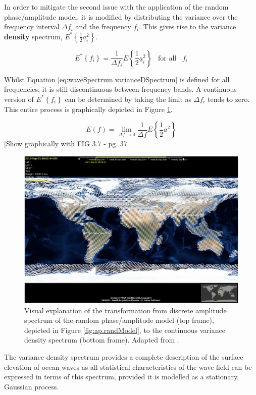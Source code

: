 In order to mitigate the second issue with the application of the random phase/amplitude model, it is modified by distributing the variance over the frequency interval $\Delta f_{i}$ and the frequency $f_{i}$. This gives rise to the variance \textbf{density} spectrum, $E^{*}\left \{ \frac{1}{2}  \underline{a}^{2}_{i}\right \}$.


\begin{equation} \label{eq:waveSpectrum.varianceDSpectrum}
    E^{*}\left \{  f_{i}\right \} = \frac{1}{\Delta f_{i}}E\left \{\frac{1}{2}  \underline{a}^{2}_{i}\right \} \; \; \; \text{for all} \; \; \;  f_{i}
\end{equation}

Whilst Equation \ref{eq:waveSpectrum.varianceDSpectrum} is defined for all frequencies, it is still discontinuous between frequency bands. A continuous version of $E^{*}\left \{  f_{i}\right \}$ can be determined by taking the limit as $\Delta f_{i}$ tends to zero. This entire process is graphically depicted in Figure \ref{fig:theory.waves.waveSpectrum.varianceDSpectrum}.

\begin{equation} \label{eq:waveSpectrum.varianceDSpectrumCont}
    E(f) = \lim_{\Delta f \to 0}\frac{1}{\Delta f}E\left \{ \frac{1}{2} \underline{a}^{2}\right \}
\end{equation}
[Show graphically with FIG 3.7 - pg. 37]

\begin{figure}[H]
    \centering
    \includegraphics[width=.5\linewidth]{Figures/LiteratureReview/Satellites/sentinelCoverage.jpg}
    \caption{Visual explanation of the transformation from discrete amplitude spectrum of the random phase/amplitude model (top frame), depicted in Figure \ref{fig:ap.randModel}, to the continuous variance density spectrum (bottom frame). Adapted from \cite{Holthuijsen2007}.}
    \label{fig:theory.waves.waveSpectrum.varianceDSpectrum}
\end{figure}

The variance density spectrum provides a complete description of the surface elevation of ocean waves as all statistical characteristics of the wave field can be expressed in terms of this spectrum, provided it is modelled as a stationary, Gaussian process.

